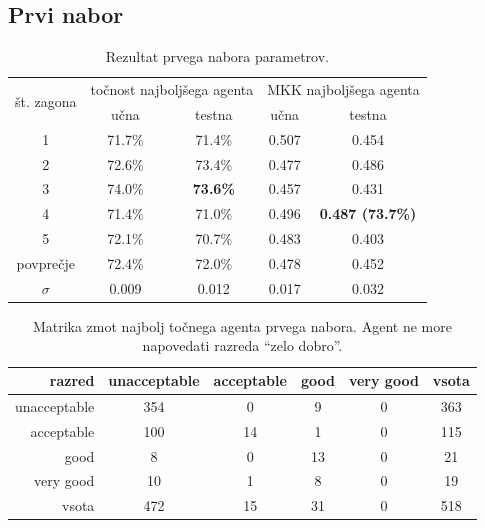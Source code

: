\subsection{Prvi nabor}\label{subsec:dodatek-car-prvi-nabor}
\begin{table}[H]
    \begin{center}
        \begin{tabular}{|| c | c c || c c ||}
            \hline
            \multirow{2}{*}{št. zagona} & \multicolumn{2}{c||}{točnost najboljšega agenta} & \multicolumn{2}{c||}{MKK najboljšega agenta} \\ \cline{2-5}
            & učna   & testna          & učna  & testna                  \\
            \hline
            1         & 71.7\% & 71.4\%          & 0.507 & 0.454                   \\
            \hline
            2         & 72.6\% & 73.4\%          & 0.477 & 0.486                   \\
            \hline
            3         & 74.0\% & \textbf{73.6\%} & 0.457 & 0.431                   \\
            \hline
            4         & 71.4\% & 71.0\%          & 0.496 & \textbf{0.487 (73.7\%)} \\
            \hline
            5         & 72.1\% & 70.7\%          & 0.483 & 0.403                   \\
            \hline
            povprečje & 72.4\% & 72.0\%          & 0.478 & 0.452                   \\
            \hline
            $\sigma$  & 0.009  & 0.012           & 0.017 & 0.032                   \\
            \hline
        \end{tabular}
    \end{center}
    \caption{Rezultat prvega nabora parametrov.}
    \label{tab:car_result_1}
\end{table}

\begin{table}[H]
    \centering
    \begin{tabular}{||rccccc||}
        \hline
        razred       & unacceptable & acceptable & good & very good & vsota \\ \hline
        unacceptable & 354          & 0          & 9    & 0         & 363   \\ \hline
        acceptable   & 100          & 14         & 1    & 0         & 115   \\ \hline
        good         & 8            & 0          & 13   & 0         & 21    \\ \hline
        very good    & 10           & 1          & 8    & 0         & 19    \\ \hline
        vsota        & 472          & 15         & 31   & 0         & 518   \\ \hline
    \end{tabular}
    \caption{Matrika zmot najbolj točnega agenta prvega nabora. Agent ne more napovedati razreda \enquote{zelo dobro}.}
    \label{tab:car_acc_1}
\end{table}

